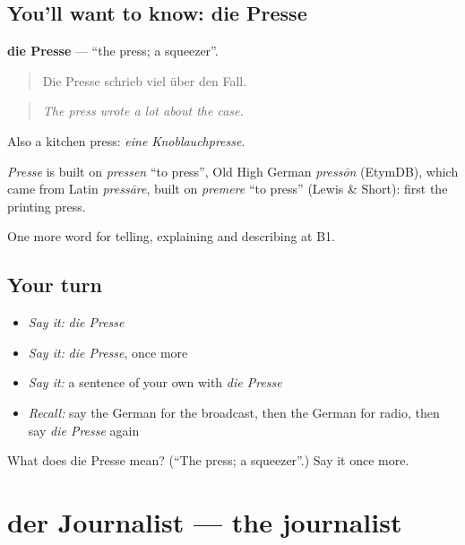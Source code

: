 \subsection*{You'll want to know: die Presse}
\textbf{die Presse} — \textquotedblleft{}the press; a squeezer\textquotedblright{}.

\begin{quote}
Die Presse schrieb viel über den Fall.
\end{quote}

\begin{quote}
\emph{The press wrote a lot about the case.}
\end{quote}

Also a kitchen press: \emph{eine Knoblauchpresse}.

\begin{cousinweb}
\emph{Presse} is built on \emph{pressen} \textquotedblleft{}to press\textquotedblright{}, Old High German \emph{pressōn} (EtymDB), which came from Latin \emph{pressāre}, built on \emph{premere} \textquotedblleft{}to press\textquotedblright{} (Lewis \& Short): first the printing press.
\end{cousinweb}

\begin{grammarlens}[title={What you've built}]
One more word for telling, explaining and describing at B1.
\end{grammarlens}

\subsection*{Your turn}
\begin{itemize}
\raggedright
  \item \emph{Say it:} \emph{die Presse}
  \item \emph{Say it:} \emph{die Presse}, once more
  \item \emph{Say it:} a sentence of your own with \emph{die Presse}
  \item \emph{Recall:} say the German for the broadcast, then the German for radio, then say \emph{die Presse} again
\end{itemize}

\begin{tcolorbox}[breakable,colback=teal!4,colframe=teal!35!black,title={Before you move on}]
What does die Presse mean? (\textquotedblleft{}The press; a squeezer\textquotedblright{}.) Say it once more.
\end{tcolorbox}
\section[der Journalist]{der Journalist — the journalist}


